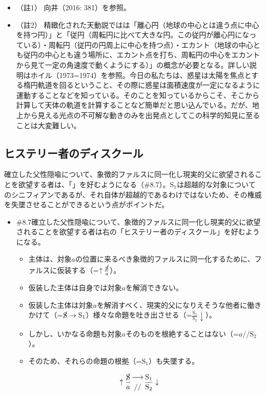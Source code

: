 \begin{itemize}
\tightlist
\item
  （註1） 向井（2016: 381）\cite{Mukai}を参照。
\item
  （註2）
  精緻化された天動説ではは「離心円（地球の中心とは違う点に中心を持つ円）」と「従円（周転円に比べて大きな円。この従円が離心円になっている）・周転円（従円の円周上に中心を持つ点）・エカント（地球の中心とも従円の中心とも違う場所に、エカント点を打ち、周転円の中心をエカントから見て一定の角速度で動くようにする）」の概念が必要となる。詳しい説明はホイル（1973=1974）\cite{Hoyle}を参照。今日の私たちは、惑星は太陽を焦点とする楕円軌道を回るということ、その際に惑星は面積速度が一定になるように運動することなどを知っている。そのことを知っているからこそ、そこから計算して天体の軌道を計算することなど簡単だと思い込んでいる。だが、地上から見える光点の不可解な動きのみを出発点としてこの科学的知見に至ることは大変難しい。
\end{itemize}

\subsection{ヒステリー者のディスクール}\label{ux30d2ux30b9ux30c6ux30eaux30fcux8005ux306eux30c7ux30a3ux30b9ux30afux30fcux30eb}

確立した父性隠喩について、象徴的ファルスに同一化し現実的父に欲望されることを欲望する者は、「」を好むようになる（\#8.7）。\(\textrm{S}_1\)は超越的な対象についてのシニフィアンであるが、それ自体が超越的であるわけではないため、その権威を失墜させることができるという点がポイントだ。

\begin{note}{}
  \begin{itemize}
    \tightlist
    \item{\#8.7}確立した父性隠喩について、象徴的ファルスに同一化し現実的父に欲望されることを欲望する者は右の「ヒステリー者のディスクール」を好むようになる。
      \begin{itemize}
        \tightlist
        \item 主体は、対象$a$の位置に来るべき象徴的ファルスに同一化するために、ファルスに仮装する（=$\uparrow\frac{\cancel{\textrm{S}}}{a}$）。
        \item 仮装した主体は自身では対象$a$を解消できない。
        \item 仮装した主体は対象$a$を解消すべく、現実的父になりえそうな他者に働きかけて（=$\cancel{\textrm{S}}\rightarrow\textrm{S}_1$）様々な命題を吐き出させる（=$\frac{\textrm{S}_1}{\textrm{S}_2}\downarrow$）。
        \item しかし、いかなる命題も対象$a$そのものを根絶することはない（=$a//\textrm{S}_2$）。
        \item そのため、それらの命題の根拠（=$\textrm{S}_1$）も失墜する。
      \end{itemize}

$$
\uparrow\frac{\cancel{\textrm{S}}}{a}\genfrac{}{}{0pt}{}{\longrightarrow}{//}\frac{\mathrm{S_1}}{\mathrm{S_2}}\downarrow
$$
  \end{itemize}
\end{note}

